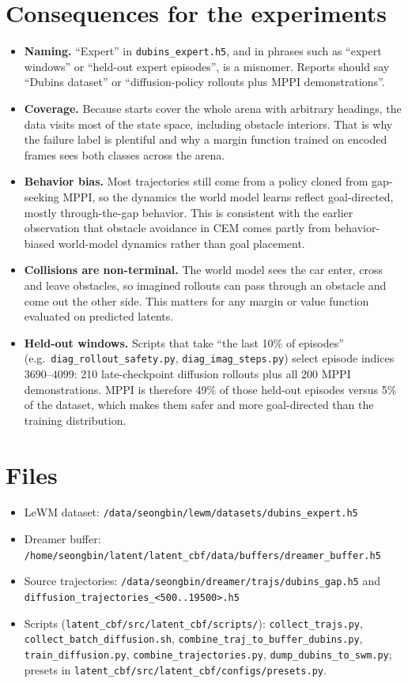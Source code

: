 \documentclass[11pt]{article}
\newcommand{\file}[1]{\nolinkurl{#1}}
\begin{document}
\section{Consequences for the experiments}

\begin{itemize}
\item \textbf{Naming.} ``Expert'' in \file{dubins_expert.h5}, and in phrases such as ``expert windows'' or ``held-out expert episodes'', is a misnomer. Reports should say ``Dubins dataset'' or ``diffusion-policy rollouts plus MPPI demonstrations''.
\item \textbf{Coverage.} Because starts cover the whole arena with arbitrary headings, the data visits most of the state space, including obstacle interiors. That is why the failure label is plentiful and why a margin function trained on encoded frames sees both classes across the arena.
\item \textbf{Behavior bias.} Most trajectories still come from a policy cloned from gap-seeking MPPI, so the dynamics the world model learns reflect goal-directed, mostly through-the-gap behavior. This is consistent with the earlier observation that obstacle avoidance in CEM comes partly from behavior-biased world-model dynamics rather than goal placement.
\item \textbf{Collisions are non-terminal.} The world model sees the car enter, cross and leave obstacles, so imagined rollouts can pass through an obstacle and come out the other side. This matters for any margin or value function evaluated on predicted latents.
\item \textbf{Held-out windows.} Scripts that take ``the last 10\% of episodes'' (e.g.\ \file{diag_rollout_safety.py}, \file{diag_imag_steps.py}) select episode indices $3690$--$4099$: 210 late-checkpoint diffusion rollouts plus all 200 MPPI demonstrations. MPPI is therefore 49\% of those held-out episodes versus 5\% of the dataset, which makes them safer and more goal-directed than the training distribution.
\end{itemize}

\section{Files}

\begin{itemize}
\item LeWM dataset: \file{/data/seongbin/lewm/datasets/dubins_expert.h5}
\item Dreamer buffer: \file{/home/seongbin/latent/latent_cbf/data/buffers/dreamer_buffer.h5}
\item Source trajectories: \file{/data/seongbin/dreamer/trajs/dubins_gap.h5} and \file{diffusion_trajectories_<500..19500>.h5}
\item Scripts (\file{latent_cbf/src/latent_cbf/scripts/}): \file{collect_trajs.py}, \file{collect_batch_diffusion.sh}, \file{combine_traj_to_buffer_dubins.py}, \file{train_diffusion.py}, \file{combine_trajectories.py}, \file{dump_dubins_to_swm.py}; presets in \file{latent_cbf/src/latent_cbf/configs/presets.py}.
\end{itemize}
\end{document}
